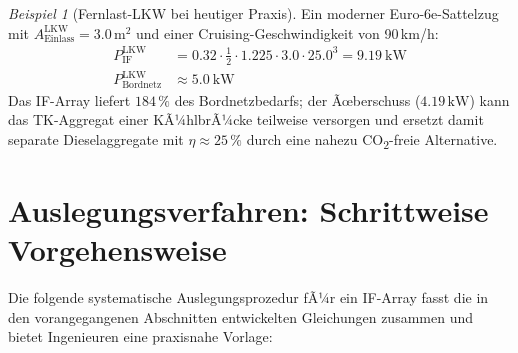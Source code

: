 ﻿\documentclass[12pt, a4paper]{report}
\theoremstyle{definition}
\theoremstyle{remark}
\newtheorem{beispiel}[theorem]{Beispiel}
\newcommand{\Aeinlass}{A_{\text{Einlass}}}
\begin{document}
\begin{beispiel}[Fernlast-LKW bei heutiger Praxis]
  Ein moderner Euro-6e-Sattelzug mit $\Aeinlass^{\text{LKW}} = 3.0\,\text{m}^2$
  und einer Cruising-Geschwindigkeit von 90\,km/h:
  \begin{align}
    P_{\text{IF}}^{\text{LKW}} &= 0.32 \cdot \tfrac{1}{2} \cdot 1.225 \cdot 3.0
    \cdot 25.0^3 = \SI{9.19}{\kilo\watt} \\
    P_{\text{Bordnetz}}^{\text{LKW}} &\approx \SI{5.0}{\kilo\watt}
  \end{align}
  Das IF-Array liefert $184\,\%$ des Bordnetzbedarfs; der Ãœberschuss
  ($4.19\,\text{kW}$) kann das TK-Aggregat einer KÃ¼hlbrÃ¼cke teilweise
  versorgen und ersetzt damit separate Dieselaggregate mit $\eta \approx 25\,\%$
  durch eine nahezu CO\textsubscript{2}-freie Alternative.
\end{beispiel}

\section{Auslegungsverfahren: Schrittweise Vorgehensweise}
\label{sec:kfz_auslegung}

Die folgende systematische Auslegungsprozedur fÃ¼r ein IF-Array fasst
die in den vorangegangenen Abschnitten entwickelten Gleichungen zusammen
und bietet Ingenieuren eine praxisnahe Vorlage:
\end{document}
